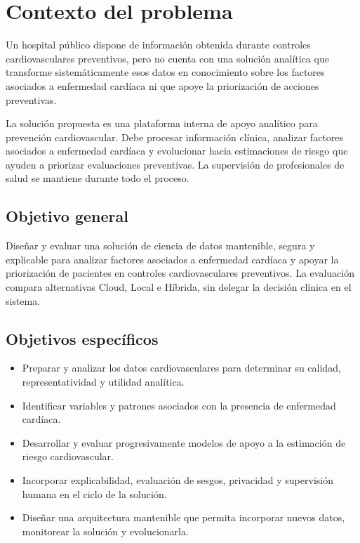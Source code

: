 \section{Contexto del problema}

Un hospital público dispone de información obtenida durante controles cardiovasculares preventivos, pero no cuenta con una solución analítica que transforme sistemáticamente esos datos en conocimiento sobre los factores asociados a enfermedad cardíaca ni que apoye la priorización de acciones preventivas.

La solución propuesta es una plataforma interna de apoyo analítico para prevención cardiovascular. Debe procesar información clínica, analizar factores asociados a enfermedad cardíaca y evolucionar hacia estimaciones de riesgo que ayuden a priorizar evaluaciones preventivas. La supervisión de profesionales de salud se mantiene durante todo el proceso.

\subsection{Objetivo general}

Diseñar y evaluar una solución de ciencia de datos mantenible, segura y explicable para analizar factores asociados a enfermedad cardíaca y apoyar la priorización de pacientes en controles cardiovasculares preventivos. La evaluación compara alternativas Cloud, Local e Híbrida, sin delegar la decisión clínica en el sistema.

\subsection{Objetivos específicos}

\begin{itemize}
  \item Preparar y analizar los datos cardiovasculares para determinar su calidad, representatividad y utilidad analítica.
  \item Identificar variables y patrones asociados con la presencia de enfermedad cardíaca.
  \item Desarrollar y evaluar progresivamente modelos de apoyo a la estimación de riesgo cardiovascular.
  \item Incorporar explicabilidad, evaluación de sesgos, privacidad y supervisión humana en el ciclo de la solución.
  \item Diseñar una arquitectura mantenible que permita incorporar nuevos datos, monitorear la solución y evolucionarla.
\end{itemize}


